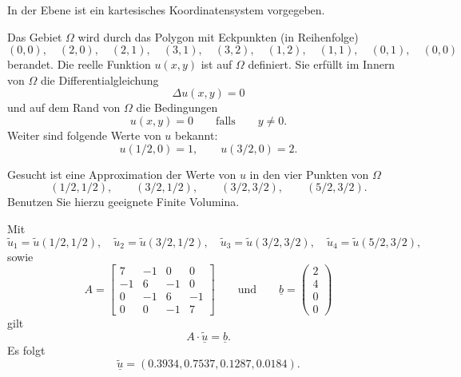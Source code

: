 In der Ebene ist ein kartesisches Koordinatensystem vorgegeben. 

\vspace{2mm}

Das Gebiet $\Omega$ wird durch das Polygon mit Eckpunkten (in Reihenfolge)
\[
(0,0), \quad(2,0), \quad(2,1), \quad(3,1),  \quad(3,2),  \quad(1,2),
\quad(1,1), \quad(0,1), \quad(0,0)
\]
berandet. Die reelle Funktion $u(x,y)$ ist auf $\Omega$ definiert. Sie erfüllt im Innern von $\Omega$ die Differentialgleichung
\[
\Delta u(x,y) = 0
\]
und auf dem Rand von $\Omega$ die Bedingungen
\[
u(x,y) = 0 \qquad \text{falls} \qquad y \neq 0.
\]
Weiter sind folgende Werte von $u$ bekannt:
\[
u(1/2,0) = 1, \qquad u(3/2,0) = 2.
\]
\vspace{1mm}

Gesucht ist eine Approximation der Werte von $u$ in den vier Punkten
von $\Omega$
\[
(1/2,1/2), \qquad (3/2,1/2), \qquad (3/2,3/2), \qquad (5/2,3/2).
\]
Benutzen Sie hierzu geeignete Finite Volumina.  

\begin{loesung}
Mit 
\[
\tilde u_1 = \tilde u(1/2,1/2), \quad
\tilde u_2 = \tilde u(3/2,1/2), \quad
\tilde u_3 = \tilde u(3/2,3/2), \quad
\tilde u_4 = \tilde u(5/2,3/2), 
\]
sowie 
\[
A = \left[\begin{array}{rrrr} 
7 & -1 & 0 & 0 \\
-1 & 6 & -1 & 0 \\
0 & -1 & 6 & -1 \\ 
0 & 0 & -1 & 7 \end{array}\right]
\qquad
\text{und}
\qquad
\underline{b} =  \left(\begin{array}{r} 2 \\ 4 \\ 0 \\ 0 \end{array}\right) 
\]
gilt 
\[
A \cdot \underline{\tilde u} = \underline{b}.
\]
Es folgt 
\[
\underline{\tilde u} = (0.3934, 0.7537, 0.1287, 0.0184).
\]
\end{loesung}
